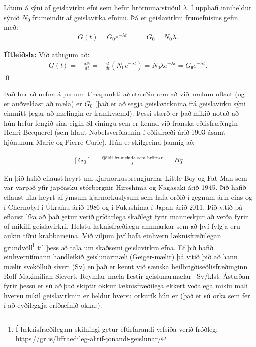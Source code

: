 \begin{tcolorbox}
\begin{theorem}
Lítum á sýni af geislavirku efni sem hefur hrörnunarstuðul $\lambda$. Í upphafi inniheldur sýnið $N_0$ frumeindir af geislavirka efninu. Þá er geislavirkni frumefnisins gefin með:
\begin{align*}
    G(t) = G_0e^{-\lambda t}, \hspace{1cm} G_0 = N_0 \lambda.
\end{align*}
\end{theorem}
\end{tcolorbox}

\textbf{Útleiðsla:} Við athugum að:
\begin{align*}
    G(t) = -\frac{dN}{dt} = -\frac{d}{dt}\left( N_0e^{-\lambda t} \right) = N_0 \lambda e^{-\lambda t} = G_0 e^{-\lambda t}.
\end{align*}
\qed

Það ber að nefna á þessum tímapunkti að stærðin sem að við mælum oftast (og er auðveldast að mæla) er $G_0$ (það er að segja geislavirknina frá geislavirku sýni einmitt þegar að mælingin er framkvæmd). Þessi stærð er það mikið notuð að hún hefur fengið sína eigin SI-einingu sem er kennd við franska eðlisfræðingin Henri Becquerel (sem hlaut Nóbelsverðlaunin í eðlisfræði árið 1903 ásamt hjónunum Marie og Pierre Curie). Hún er skilgreind þannig að:

\begin{align*}
    \left[ G_0 \right] = \SI{}{\frac{\text{fjöldi frumeinda sem hrörnar}}{s}} = \SI{}{Bq}
\end{align*}

En þið hafið eflaust heyrt um kjarnorkusprengjurnar Little Boy og Fat Man sem var varpað yfir japönsku stórborgnir Hiroshima og Nagasaki árið 1945. Þið hafið eflaust líka heyrt af ýmsum kjarnorkuslysum sem hafa orðið í gegnum árin eins og í Chernobyl í Úkraínu árið 1986 og í Fukushima í Japan árið 2011. Þið vitið þá eflaust líka að það getur verið gríðarlega skaðlegt fyrir manneskjur að verða fyrir of mikilli geislavirkni. Helstu læknisfræðilegu annmarkar sem að því fylgja eru aukin tíðni krabbameina. Við viljum því hafa einhvern læknisfræðilegan grundvöll\footnote{Í læknisfræðilegum skilningi getur eftirfarandi vefsíða verið fróðleg: \href{https://gr.is/liffraedileg-ahrif-jonandi-geislunar/}{https://gr.is/liffraedileg-ahrif-jonandi-geislunar/}} til þess að tala um skaðsemi geislavirkra efna. Ef þið hafið einhverntímann handleikið geislunarmæli (Geiger-mælir) þá vitið þið að hann mælir svokölluð sívert (\si{Sv}) en það er kennt við sænska heilbrigðiseðlisfræðinginn Rolf Maximilian Sievert. Reyndar mæla flestir geislunarmælar \si{\mu Sv/klst}. Ástæðan fyrir þessu er sú að það skiptir okkur læknisfræðilega ekkert voðalega miklu máli hversu mikil geislavirknin er heldur hversu orkurík hún er (það er sú orka sem fer í að eyðileggja erfðaefnið okkar). 


